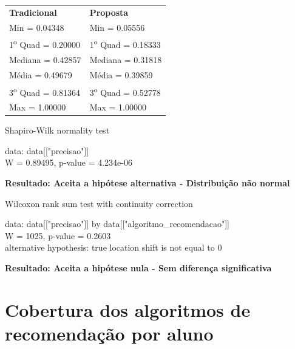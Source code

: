 \begin{table}[h]
\begin{tabular}{p{}p{}}
\textbf{Tradicional} & \textbf{Proposta}\\
Min = 0.04348 & Min = 0.05556\\
1\textsuperscript{o} Quad = 0.20000 & 1\textsuperscript{o} Quad = 0.18333\\
Mediana = 0.42857 & Mediana = 0.31818\\
Média = 0.49679 & Média = 0.39859\\
3\textsuperscript{o} Quad = 0.81364 & 3\textsuperscript{o} Quad = 0.52778\\
Max = 1.00000 & Max = 1.00000\\
\end{tabular}
\end{table}

  Shapiro-Wilk normality test

\noindent
data:  data[["precisao"]]\\
W = 0.89495, p-value = 4.234e-06

\noindent
\textbf{Resultado: Aceita a hipótese alternativa - Distribuição não normal}

Wilcoxon rank sum test with continuity correction

\noindent
data:  data[["precisao"]] by data[["algoritmo\_recomendacao"]]\\
W = 1025, p-value = 0.2603\\
alternative hypothesis: true location shift is not equal to 0

\noindent
\textbf{Resultado: Aceita a hipótese nula - Sem diferença significativa}

\newpage
\section{Cobertura dos algoritmos de recomendação por aluno}

